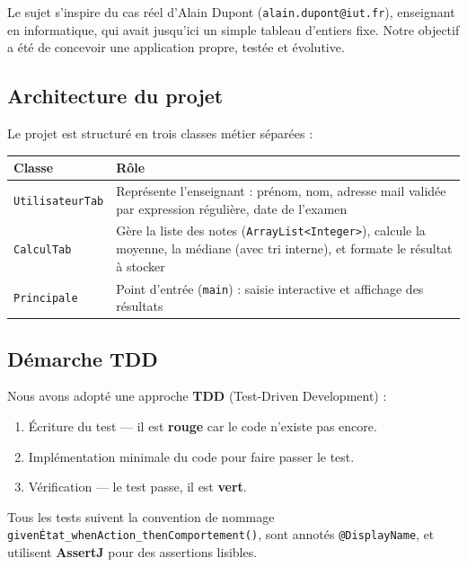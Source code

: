 \documentclass[a4paper,12pt]{article}
\begin{document}
Le sujet s'inspire du cas réel d'Alain Dupont (\texttt{alain.dupont@iut.fr}),
enseignant en informatique, qui avait jusqu'ici un simple tableau d'entiers
fixe. Notre objectif a été de concevoir une application propre, testée et
évolutive.

\subsection{Architecture du projet}

Le projet est structuré en trois classes métier séparées :

\begin{center}
\begin{tabular}{lp{9.5cm}}
  \toprule
  \textbf{Classe}         & \textbf{Rôle} \\
  \midrule
  \texttt{UtilisateurTab} & Représente l'enseignant : prénom, nom, adresse mail
                            validée par expression régulière, date de l'examen \\
  \texttt{CalculTab}      & Gère la liste des notes (\texttt{ArrayList<Integer>}),
                            calcule la moyenne, la médiane (avec tri interne), et
                            formate le résultat à stocker \\
  \texttt{Principale}     & Point d'entrée (\texttt{main}) : saisie interactive et
                            affichage des résultats \\
  \bottomrule
\end{tabular}
\end{center}

\subsection{Démarche TDD}

Nous avons adopté une approche \textbf{TDD} (Test-Driven Development) :

\begin{enumerate}
  \item Écriture du test --- il est \textbf{rouge} car le code n'existe pas encore.
  \item Implémentation minimale du code pour faire passer le test.
  \item Vérification --- le test passe, il est \textbf{vert}.
\end{enumerate}

Tous les tests suivent la convention de nommage
\texttt{givenÉtat\_whenAction\_thenComportement()}, sont annotés
\texttt{@DisplayName}, et utilisent \textbf{AssertJ} pour des assertions
lisibles.
\end{document}
